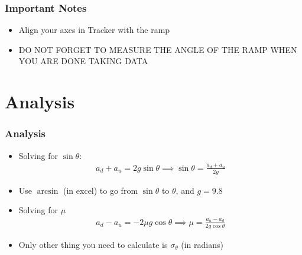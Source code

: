 \documentclass[aspectratio=169]{beamer}
\begin{document}
\begin{frame}
  \frametitle{Important Notes}
  \begin{itemize}
  \item Align your axes in Tracker with the ramp
  \item DO NOT FORGET TO MEASURE THE ANGLE OF THE RAMP WHEN YOU ARE DONE TAKING DATA
  \end{itemize}
\end{frame}

\section{Analysis}
\begin{frame}
  \frametitle{Analysis}
  \begin{itemize}
  \item Solving for $\sin\theta$:
    \pause
    \begin{align*}
      a_d+a_u=2g\sin\theta\implies
      \boxed{\sin\theta=\frac{a_d+a_u}{2g}}
    \end{align*}
  \item Use $\arcsin$ (in excel) to go from $\sin\theta$ to $\theta$, and $g=9.8$
    \pause
  \item Solving for $\mu$
    \pause
    \begin{align*}
      a_d-a_u=-2\mu g\cos\theta\implies
      \boxed{\mu=\frac{a_u-a_d}{2g\cos\theta}}
    \end{align*}
  \item Only other thing you need to calculate is $\sigma_\theta$ (in radians)
  \end{itemize}
\end{frame}
\end{document}
